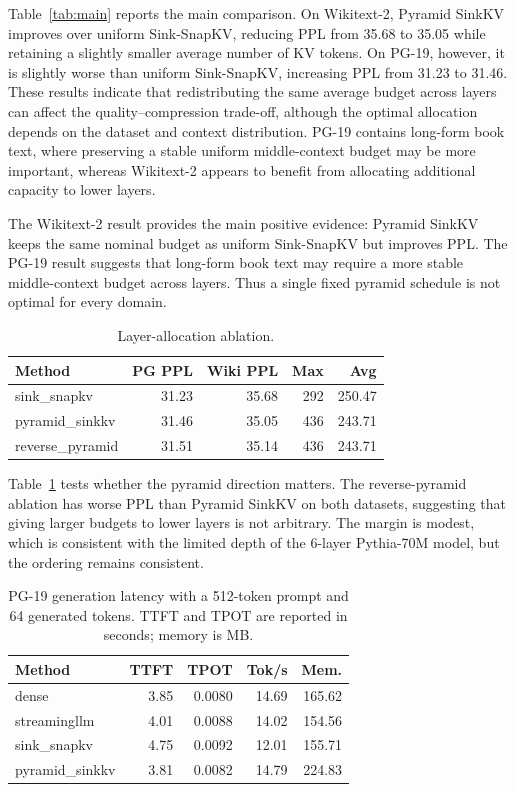 \documentclass{article}
\begin{document}
Table~\ref{tab:main} reports the main comparison. On Wikitext-2, Pyramid SinkKV
improves over uniform Sink-SnapKV, reducing PPL from 35.68 to 35.05 while
retaining a slightly smaller average number of KV tokens. On PG-19, however, it
is slightly worse than uniform Sink-SnapKV, increasing PPL from 31.23 to 31.46.
These results indicate that redistributing the same average budget across layers
can affect the quality--compression trade-off, although the optimal allocation
depends on the dataset and context distribution. PG-19 contains long-form book
text, where preserving a stable uniform middle-context budget may be more
important, whereas Wikitext-2 appears to benefit from allocating additional
capacity to lower layers.

The Wikitext-2 result provides the main positive evidence: Pyramid SinkKV keeps
the same nominal budget as uniform Sink-SnapKV but improves PPL. The PG-19 result
suggests that long-form book text may require a more stable middle-context
budget across layers. Thus a single fixed pyramid schedule is not optimal for
every domain.

\begin{table}[t]
  \centering
  \small
  \caption{Layer-allocation ablation.}
  \label{tab:ablation}
  \begin{tabular}{lrrrr}
    \toprule
    Method & PG PPL & Wiki PPL & Max & Avg \\
    \midrule
    sink\_snapkv & 31.23 & 35.68 & 292 & 250.47 \\
    pyramid\_sinkkv & 31.46 & 35.05 & 436 & 243.71 \\
    reverse\_pyramid & 31.51 & 35.14 & 436 & 243.71 \\
    \bottomrule
  \end{tabular}
\end{table}

Table~\ref{tab:ablation} tests whether the pyramid direction matters. The
reverse-pyramid ablation has worse PPL than Pyramid SinkKV on both datasets,
suggesting that giving larger budgets to lower layers is not arbitrary. The
margin is modest, which is consistent with the limited depth of the 6-layer
Pythia-70M model, but the ordering remains consistent.

\begin{table}[t]
  \centering
  \small
  \caption{PG-19 generation latency with a 512-token prompt and 64 generated
  tokens. TTFT and TPOT are reported in seconds; memory is MB.}
  \label{tab:latency}
  \begin{tabular}{lrrrr}
    \toprule
    Method & TTFT & TPOT & Tok/s & Mem. \\
    \midrule
    dense & 3.85 & 0.0080 & 14.69 & 165.62 \\
    streamingllm & 4.01 & 0.0088 & 14.02 & 154.56 \\
    sink\_snapkv & 4.75 & 0.0092 & 12.01 & 155.71 \\
    pyramid\_sinkkv & 3.81 & 0.0082 & 14.79 & 224.83 \\
    \bottomrule
  \end{tabular}
\end{table}
\end{document}
